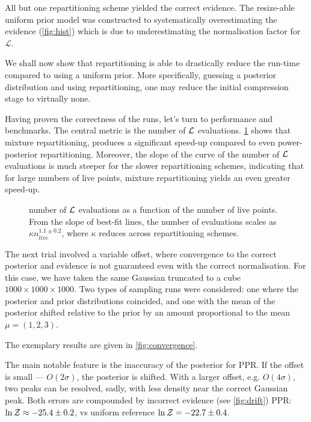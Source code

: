 \documentclass[usenatbib]{mnras}
\begin{document}
All but one repartitioning scheme yielded the correct evidence. The
resize-able uniform prior model was constructed to systematically
overestimating the evidence (\cref{fig:hist}) which is due to
underestimating the normalisation factor for
\(\mathcal{L}\).


We shall now show that repartitioning is able to drastically reduce
the run-time compared to using a uniform prior. More specifically,
guessing a posterior distribution and using repartitioning, one may
reduce the initial compression stage to virtually none.

Having proven the correctness of the runs, let's turn to performance
and benchmarks. The central metric is the number of \({\cal L}\)
evaluations. \cref{fig:benchmark} shows that mixture
repartitioning, produces a significant speed-up compared to even
power-posterior repartitioning. Moreover, the slope of the curve of
the number of \({\cal L}\) evaluations is much steeper for the
slower repartitioning schemes, indicating that for large numbers of
live points, mixture repartitioning yields an even greater
speed-up.



\begin{figure}
  
  \caption{number of ${\cal L}$ evaluations as a function of the
    number of live points. From the slope of best-fit lines, the
    number of evaluations scales as $\kappa n_{live}^{1.1 \pm 0.2}$,
    where $\kappa$ reduces across repartitioning
    schemes. \label{fig:benchmark}}
\end{figure}




The next trial involved a variable offset, where convergence to the
correct posterior and evidence is not guaranteed even with the correct
normalisation. For this case, we have taken the same Gaussian
truncated to a cube \(1000\times1000\times1000\). Two types of
sampling runs were considered: one where the posterior and prior
distributions coincided, and one with the mean of the posterior
shifted relative to the prior by an amount proportional to the mean
$\mu = (1,2,3)$.

The exemplary results are given in \cref{fig:convergence}.

The main notable feature is the inaccuracy of the posterior for
PPR. If the offset is small --- \(O(2\sigma)\), the posterior is
shifted. With a larger offset, e.g. \(O(4\sigma)\), two peaks can be
resolved, sadly, with less density near the correct Gaussian
peak. Both errors are compounded by incorrect evidence (see
\cref{fig:drift}) PPR: \(\ln {\cal Z}\approx -25.4 \pm 0.2\), vs
uniform reference \(\ln {\cal Z} = -22.7 \pm 0.4\).
\end{document}
